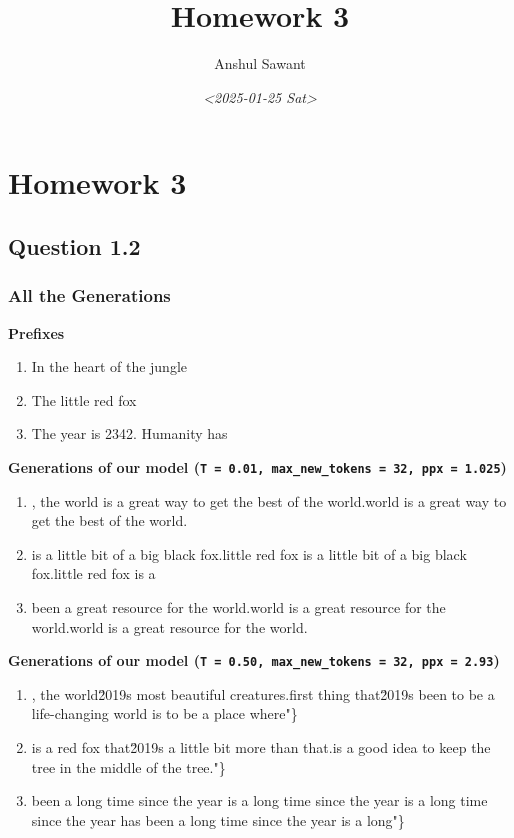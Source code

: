 \documentclass[11pt]{article}
\author{Anshul Sawant}
\date{\textit{<2025-01-25 Sat>}}
\title{Homework 3}
\begin{document}
\maketitle
\tableofcontents

\section{Homework 3}
\label{sec:org0c0026f}
\subsection{Question 1.2}
\label{sec:org157fc3e}
\subsubsection{All the Generations}
\label{sec:org4d41dfb}

\textbf{Prefixes}
\begin{enumerate}
\item In the heart of the jungle
\item The little red fox
\item The year is 2342. Humanity has
\end{enumerate}


\textbf{Generations of our model (\texttt{T = 0.01, max\_new\_tokens = 32, ppx = 1.025})}
\begin{enumerate}
\item , the world is a great way to get the best of the world.\nThe world is a great way to get the best of the world.\nThe
\item is a little bit of a big black fox.\nThe little red fox is a little bit of a big black fox.\nThe little red fox is a
\item been a great resource for the world.\nThe world is a great resource for the world.\nThe world is a great resource for the world.\nThe
\end{enumerate}


\textbf{Generations of our model (\texttt{T = 0.50, max\_new\_tokens = 32, ppx = 2.93})}
\begin{enumerate}
\item , the world\u2019s most beautiful creatures.\nThe first thing that\u2019s been to be a life-changing world is to be a place where"\}
\item is a red fox that\u2019s a little bit more than that.\nThis is a good idea to keep the tree in the middle of the tree."\}
\item been a long time since the year is a long time since the year is a long time since the year has been a long time since the year is a long"\}
\end{enumerate}
\end{document}
